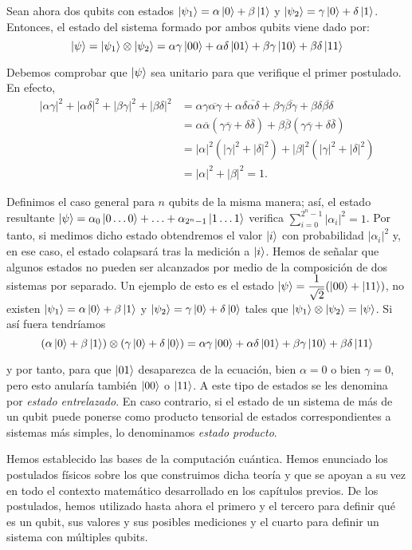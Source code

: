 Sean ahora dos qubits con estados $\left|\psi_1\right\rangle=\alpha\left|0\right\rangle+\beta\left|1\right\rangle$ y $\left|\psi_2\right\rangle=\gamma\left|0\right\rangle+\delta\left|1\right\rangle$. Entonces, el estado del sistema formado por ambos qubits viene dado por:
\[\left|\psi\right\rangle=\left|\psi_1\right\rangle\otimes\left|\psi_2\right\rangle=\alpha\gamma\left|00\right\rangle+\alpha\delta\left|01\right\rangle+\beta\gamma\left|10\right\rangle+\beta\delta\left|11\right\rangle\]

Debemos comprobar que $\left|\psi\right\rangle$ sea unitario para que verifique el primer postulado. En efecto,
\[
\begin{split}
|\alpha\gamma|^2+|\alpha\delta|^2+|\beta\gamma|^2+|\beta\delta|^2&=\alpha\gamma\overline{\alpha\gamma}+\alpha\delta\overline{\alpha\delta}+\beta\gamma\overline{\beta\gamma}+\beta\delta\overline{\beta\delta}\\
&=\alpha\overline{\alpha}(\gamma\overline{\gamma}+\delta\overline{\delta})+\beta\overline{\beta}(\gamma\overline{\gamma}+\delta\overline{\delta})\\
&=|\alpha|^2(|\gamma|^2+|\delta|^2)+|\beta|^2(|\gamma|^2+|\delta|^2)\\
&=|\alpha|^2+|\beta|^2=1.
\end{split}
\]

Definimos el caso general para $n$ qubits de la misma manera; así, el estado resultante $\left|\psi\right\rangle=\alpha_0\left|0\hdots0\right\rangle+\hdots+\alpha_{2^n-1}\left|1\hdots1\right\rangle$ verifica $\sum_{i=0}^{2^n-1}|\alpha_i|^2=1$. Por tanto, si medimos dicho estado obtendremos el valor $\left|i\right\rangle$ con probabilidad $|\alpha_i|^2$ y, en ese caso, el estado colapsará tras la medición a $\left|i\right\rangle$. Hemos de señalar que algunos estados no pueden ser alcanzados por medio de la composición de dos sistemas por separado. Un ejemplo de esto es el estado $\left|\psi\right\rangle=\dfrac{1}{\sqrt{2}}(\left|00\right\rangle+\left|11\right\rangle)$, no existen $\left|\psi_1\right\rangle=\alpha\left|0\right\rangle+\beta\left|1\right\rangle$ y $\left|\psi_2\right\rangle=\gamma\left|0\right\rangle+\delta\left|0\right\rangle$ tales que $\left|\psi_1\right\rangle\otimes\left|\psi_2\right\rangle=\left|\psi\right\rangle$. Si así fuera tendríamos
\[(\alpha\left|0\right\rangle+\beta\left|1\right\rangle)\otimes(\gamma\left|0\right\rangle+\delta\left|0\right\rangle)=\alpha\gamma\left|00\right\rangle+\alpha\delta\left|01\right\rangle+\beta\gamma\left|10\right\rangle+\beta\delta\left|11\right\rangle\]

y por tanto, para que $\left|01\right\rangle$ desaparezca de la ecuación, bien $\alpha =0$ o bien $\gamma=0$, pero esto anularía también $\left|00\right\rangle$ o $\left|11\right\rangle$. A este tipo de estados se les denomina por \textit{estado entrelazado}. En caso contrario, si el estado de un sistema de más de un qubit puede ponerse como producto tensorial de estados correspondientes a sistemas más simples, lo denominamos \textit{estado producto}.

Hemos establecido las bases de la computación cuántica. Hemos enunciado los postulados físicos sobre los que construimos dicha teoría y que se apoyan a su vez en todo el contexto matemático desarrollado en los capítulos previos. De los postulados, hemos utilizado hasta ahora el primero y el tercero para definir qué es un qubit, sus valores y sus posibles mediciones y el cuarto para definir un sistema con múltiples qubits.

